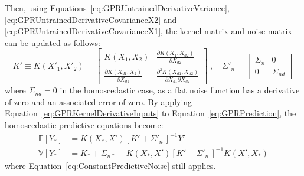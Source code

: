 \documentclass{article}
\begin{document}
Then, using Equations~\eqref{eq:GPRUntrainedDerivativeVariance}, \eqref{eq:GPRUntrainedDerivativeCovarianceX2} and \eqref{eq:GPRUntrainedDerivativeCovarianceX1}, the kernel matrix and noise matrix can be updated as follows:
\begin{equation}
\label{eq:GPRKernelDerivativeInputs}
	K' \equiv K\!\left(X'_1,X'_2\right) =
	\begin{bmatrix}
	K\!\left(X_1,X_2\right) & \frac{\partial K\!\left(X_1,X_{d2}\right)}{\partial X_{d2}} \\
	\frac{\partial K\!\left(X_{d1},X_2\right)}{\partial X_{d1}} & \frac{\partial^2 K\!\left(X_{d1},X_{d2}\right)}{\partial X_{d1} \partial X_{d2}}
	\end{bmatrix}
	\;, \quad
	\Sigma'_n =
	\begin{bmatrix}
	\Sigma_n & 0 \\
	0 & \Sigma_{nd}
	\end{bmatrix}
\end{equation}
where $\Sigma_{nd} = 0$ in the homoscedastic case, as a flat noise function has a derivative of zero and an associated error of zero. By applying Equation~\eqref{eq:GPRKernelDerivativeInputs} to Equation~\eqref{eq:GPRPrediction}, the homoscedastic predictive equations become:
\begin{equation}
\label{eq:GPRPredictionDerivativeInputs}
	\begin{aligned}
	\mathbb{E}\!\left[Y_*\right] &= K\!\left(X_*,X'\right) \left[K' + \Sigma'_n\,\right]^{-1} Y' \\
	\mathbb{V}\!\left[Y_*\right] &= K_* + \Sigma_{n*} - K\!\left(X_*,X'\right) \left[K' + \Sigma'_n\,\right]^{-1} K\!\left(X',X_*\right)
	\end{aligned}
\end{equation}
where Equation~\eqref{eq:ConstantPredictiveNoise} still applies.
\end{document}
